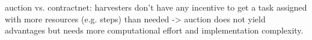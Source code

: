 

auction vs. contractnet:
harvesters don't have any incentive to get a task assigned with more resources (e.g. steps) than needed -> auction does not yield advantages but needs more computational effort and implementation complexity.